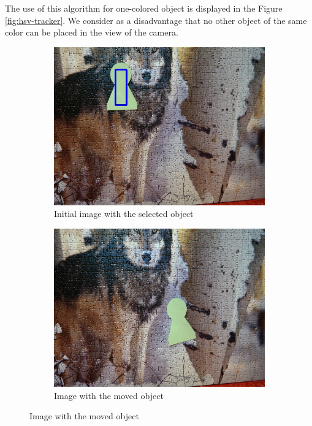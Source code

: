 The use of this algorithm for one-colored object is displayed in the Figure
\ref{fig:hsv-tracker}. We consider as a disadvantage that no other object of
the same color can be placed in the view of the camera.

\begin{figure}
  \centering
  \begin{subfigure}[b]{0.48\linewidth}
    \includegraphics[width=\linewidth]{img/hsv/initial.jpg}
    \caption{Initial image with the selected object}
  \end{subfigure}
  \begin{subfigure}[b]{0.48\linewidth}
    \includegraphics[width=\linewidth]{img/hsv/object.jpg}
    \caption{Image with the moved object}

\end{subfigure}
\end{figure}

